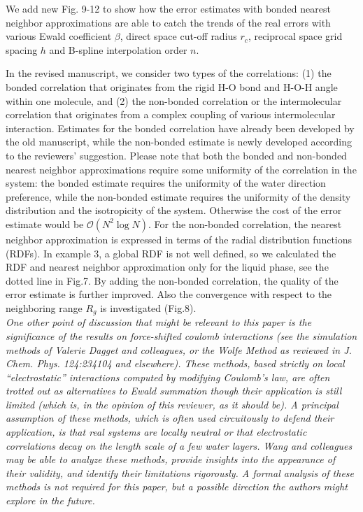 \documentclass[a4paper]{article}
\begin{document}
We add new Fig. 9-12 to show how the error estimates
with bonded nearest neighbor approximations are able to catch the
trends of the real errors with various Ewald coefficient $\beta$, direct space
cut-off radius $r_c$, reciprocal space grid spacing $h$ and B-spline
interpolation order $n$.

In the revised manuscript,
we consider two types of the correlations:
(1) the bonded correlation
that originates from the rigid H-O
bond and H-O-H angle within one molecule,
and (2) the
non-bonded correlation or the
intermolecular correlation that originates from
a complex coupling of various intermolecular interaction.
Estimates for the bonded correlation
have already been developed by the old manuscript,
while the non-bonded estimate
is newly developed according to the reviewers' suggestion.
Please note that
both the bonded and non-bonded nearest neighbor approximations
require some uniformity of the correlation in the system:
the bonded estimate requires the uniformity of the water
direction preference, while the non-bonded estimate requires the uniformity
of the density distribution and the isotropicity of the system.
Otherwise the cost of the error estimate would be $\mathcal O(N^2\log N)$.
For the non-bonded correlation,  the nearest neighbor approximation 
is expressed in terms of the radial distribution
functions (RDFs). In example 3, a global RDF is not well defined,
so we calculated the RDF and nearest neighbor approximation
only for the liquid phase, see the dotted line in Fig.7. By adding
the non-bonded correlation, the quality of the error estimate
is further improved.
Also the convergence with respect to
the neighboring range $R_g$ is investigated (Fig.8). 
\\



\textit{
One other point of discussion that might be relevant to this paper is
the significance of the results on force-shifted coulomb interactions
(see the simulation methods of Valerie Dagget and colleagues, or the
Wolfe Method as reviewed in J. Chem. Phys. 124:234104 and elsewhere).
These methods, based strictly on local “electrostatic” interactions
computed by modifying Coulomb’s law, are often trotted out as
alternatives to Ewald summation though their application is still
limited (which is, in the opinion of this reviewer, as it should be).
A principal assumption of these methods, which is often used
circuitously to defend their application, is that real systems are
locally neutral or that electrostatic correlations decay on the length
scale of a few water layers.  Wang and colleagues may be able to
analyze these methods, provide insights into the appearance of their
validity, and identify their limitations rigorously.  A formal
analysis of these methods is not required for this paper, but a
possible direction the authors might explore in the future.
}
\end{document}
